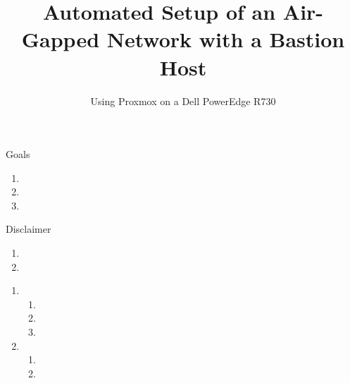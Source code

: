\documentclass[14pt,compress,usenames,dvipsnames,aspectratio=169]{beamer}
\title{\textbf{Automated Setup of an Air-Gapped Network with a Bastion Host}}
\author{Using Proxmox on a Dell PowerEdge R730}
\date{}  %
\begin{document}

\begin{frame}[plain]
\titlepage
\end{frame}



\begin{frame}{Goals}
    \begin{enumerate}
        \item{} 
        \item{}
        \item{}
    \end{enumerate}
\end{frame}


\begin{frame}{Disclaimer}
    \begin{enumerate}
        \item{} 
        \item{}
    \end{enumerate}
\end{frame}





\begin{frame}{}
    \begin{enumerate}
        \item{} 
            \begin{enumerate}
                \item{}
                \item{}
                \item{}
            \end{enumerate}

        \item{}
            \begin{enumerate}
                \item{}
                \item{}
            \end{enumerate}
    \end{enumerate}
\end{frame}
\end{document}
